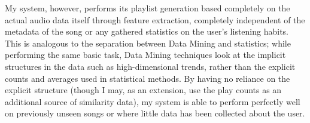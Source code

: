 My system, however, performs its playlist generation based completely on the actual audio data itself through feature extraction, completely independent of the metadata of the song or any gathered statistics on the user's listening habits. This is analogous to the separation between Data Mining and statistics; while performing the same basic task, Data Mining techniques look at the implicit structures in the data such as high-dimensional trends, rather than the explicit counts and averages used in statistical methods. By having no reliance on the explicit structure (though I may, as an extension, use the play counts as an additional source of similarity data), my system is able to perform perfectly well on previously unseen songs or where little data has been collected about the user.

